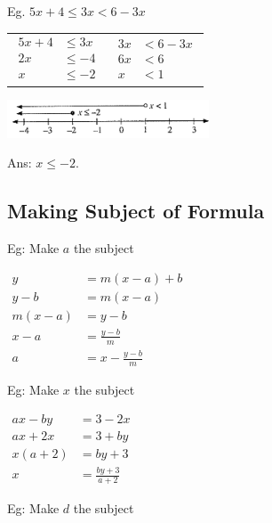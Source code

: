 \documentclass[twocolumn]{article}
\begin{document}
\bigskip 

\noindent 
Eg. $5 x+4 \leq 3 x<6-3 x$

\bigskip 
\begin{tabular}{c|c} 
$
\begin{aligned}
	5 x+4 & \leq 3 x \\
	2 x & \leq-4\\
	x & \leq-2
\end{aligned}
$
	& 
$
\begin{aligned}
3 x & <6-3 x \\
6 x & <6 \\
x & <1
\end{aligned}
$
\end{tabular} 

\bigskip 

\includegraphics[width=0.45\textwidth]{04.png}

\bigskip 

\noindent 
Ans: $x \leq -2$.


\subsection*{Making Subject of Formula}

\bigskip 

\noindent 
Eg: Make $a$ the subject

\noindent 
$\begin{aligned} y & = m(x-a)+b \\ y-b & =m(x-a) \\ m(x-a) & =y-b \\ x-a & =\frac{y-b}{m} \\ a & =x-\frac{y-b}{m}\end{aligned}$

\bigskip 

\noindent 
Eg: Make $x$ the subject

\noindent 
$\begin{aligned} a x-b y & =3-2 x \\ a x+2 x & =3+b y \\ x(a+2) & =b y+3 \\ x & =\frac{b y+3}{a+2}\end{aligned}$

\bigskip 

\noindent 
Eg: Make $d$ the subject
\end{document}
